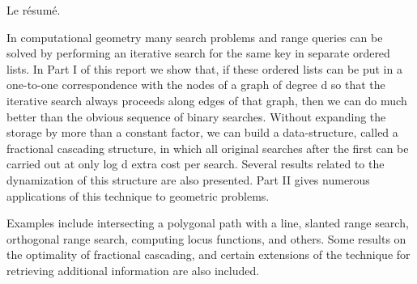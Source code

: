 \documentclass[11pt]{thesul}
\begin{document}
\NumberAbstractPages
\begin{ThesisAbstract}
  \begin{FrenchAbstract}
    Le résumé.
  \end{FrenchAbstract}
  \begin{EnglishAbstract}
    In computational geometry many search problems and range queries
    can be solved by performing an iterative search for the same key
    in separate ordered lists.  In Part I of this report we show that,
    if these ordered lists can be put in a one-to-one correspondence
    with the nodes of a graph of degree  d  so that the iterative
    search always proceeds along edges of that graph, then we can
    do much better than the obvious sequence of binary searches. Without
    expanding the storage by more than a constant factor, we can build
    a data-structure, called a fractional cascading structure,
    in which all original searches after the first can be carried
    out at only  log d  extra cost per search.  Several results related
    to the dynamization of this structure are also presented. Part
    II gives  numerous applications of this technique to geometric
    problems.  

    Examples include intersecting a polygonal path with
    a line, slanted range search, orthogonal range search, computing
    locus functions, and others. Some results on the optimality of
    fractional cascading, and certain extensions of the technique
    for retrieving additional information are also included.
  \end{EnglishAbstract}
\end{ThesisAbstract}
\end{document}
